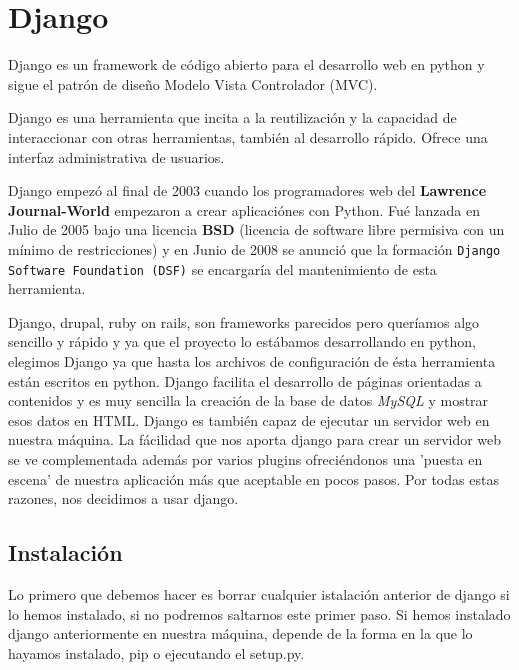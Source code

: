 
\chapter{Django}

Django es un framework de código abierto para el desarrollo web en python y sigue el patrón de diseño Modelo Vista Controlador (MVC).

Django es una herramienta que incita a la reutilización y la capacidad de interaccionar con otras herramientas, también al desarrollo rápido. Ofrece una interfaz administrativa de usuarios.

Django empezó al final de 2003 cuando los programadores web del \textbf{Lawrence Journal-World} empezaron a crear aplicaciónes con Python. Fué lanzada en Julio de 2005 bajo una licencia \textbf{BSD} (licencia de software libre permisiva con un mínimo de restricciones) y en Junio de 2008 se anunció que la formación \texttt{Django Software Foundation (DSF)} se encargaría del mantenimiento de esta herramienta.

Django, drupal, ruby on rails, son frameworks parecidos pero queríamos algo sencillo y rápido y ya que el proyecto lo estábamos desarrollando en python, elegimos Django ya que hasta los archivos de configuración de ésta herramienta están escritos en python.
Django facilita el desarrollo de páginas orientadas a contenidos y es muy sencilla la creación de la base de datos \textit{MySQL} y mostrar esos datos en HTML. Django es también capaz de ejecutar un servidor web en nuestra máquina.
La fácilidad que nos aporta django para crear un servidor web se ve complementada además por varios plugins ofreciéndonos una 'puesta en escena' de nuestra aplicación más que aceptable en pocos pasos. Por todas estas razones, nos decidimos a usar django.


\section{Instalación}
Lo primero que debemos hacer es borrar cualquier istalación anterior de django si lo hemos instalado, si no podremos saltarnos este primer paso. Si hemos instalado django anteriormente en nuestra máquina, depende de la forma en la que lo hayamos instalado, pip o ejecutando el setup.py.

